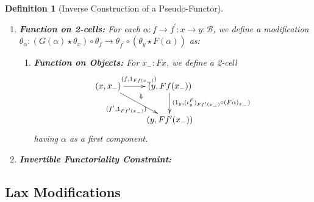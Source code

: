 \documentclass{article}
\numberwithin{equation}{section}
\theoremstyle{definition}
\theoremstyle{plain}
\newtheorem{definition}[equation]{Definition}
\begin{document}
\begin{definition}[Inverse Construction of a Pseudo-Functor]
\begin{enumerate}[label = $\bullet$]
		\item \textbf{Function on 2-cells:} For each $\alpha:f \to f^{\prime}: x \to y:\mathcal{B}$, we define a modification $\theta_\alpha: (G(\alpha)\star\theta_x)\circ \theta_f \to \theta_{f^{\prime}} \circ (\theta_y\star F(\alpha))$ as:
		\begin{enumerate}
			\item \textbf{Function on Objects:} For $x_-:Fx$, we define a 2-cell
			\[\xymatrix{
				(x,x_-) \ar[r]^{(f,1_{Ff(x_-)})} \ar[dr]_{(f^{\prime},1_{Ff^{\prime}(x_-)})} \ar@{}[drr]|(0.3){\Downarrow} & (y, Ff(x_-)) \ar[d]^{(1_y, (\iota^F_y)_{Ff^{\prime}(x_-)} \circ (F\alpha)_{x_-})}\\
				& (y, Ff^{\prime}(x_-)) &
			}\]
			having $\alpha$ as a first component.
		\end{enumerate}
		
		\item \textbf{Invertible Functoriality Constraint:} 
	\end{enumerate}
\end{definition}

\subsection{Lax Modifications}
\end{document}
